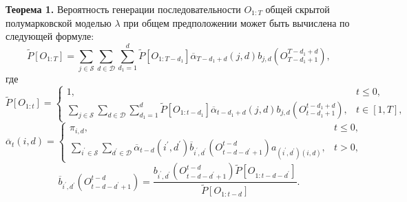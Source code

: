 \documentclass[twoside,12pt]{article}
\begin{document}
\textbf{Теорема 1.} Вероятность генерации последовательности $O_{1:T}$ общей скрытой полумарковской моделью $\lambda$ при общем предположении может быть вычислена по следующей формуле:
\begin{equation}\nonumber
\widetilde{P}[O_{1:T}]=\sum\limits_{j\in \mathcal{S}}\sum\limits_{d \in \mathcal{D}}\sum\limits_{d_1=1}^{d}\widetilde{P}[O_{1:T-d_1}]\overline{\alpha}_{T-d_1+d}(j,d)b_{j,d}(O_{T-d_1+1}^{T-d_1+d}),
\end{equation}
где
\begin{equation}\nonumber
\widetilde{P}[O_{1:t}]=\left\{\begin{array}{ll}
1, &t\leq 0,\\\sum\limits_{j\in \mathcal{S}}\sum\limits_{d \in \mathcal{D}}\sum\limits_{d_1=1}^{d}\widetilde{P}[O_{1:t-d_1}]\overline{\alpha}_{t-d_1+d}(j,d)b_{j,d}(O_{t-d_1+1}^{t-d_1+d}),& t\in [1,T],\end{array}\right.
\end{equation}
\begin{equation}\nonumber
\overline{\alpha}_{t}(i,d)=\left\{
\begin{array}{ll}
\pi_{i,d}, &t\leq 0,\\
\sum\limits_{i^\prime\in \mathcal{S}}\sum\limits_{d^\prime \in \mathcal{D}}\overline{\alpha}_{t-d}(i^\prime,d^\prime)\overline{b}_{i^\prime,d^\prime}(O_{t-d-d^\prime+1}^{t-d})
a_{(i^\prime, d^\prime)(i,d)}, & t>0,
\end{array}\right.
\end{equation}
\begin{equation}
\nonumber
\overline{b}_{i^\prime,d^\prime}(O_{t-d-d^\prime+1}^{t-d})=\frac{b_{i^\prime,d^\prime}(O_{t-d-d^\prime+1}^{t-d})\widetilde{P}[O_{1:t-d-d^\prime}]}{\widetilde{P}[O_{1:t-d}]}.
\end{equation}
\end{document}
